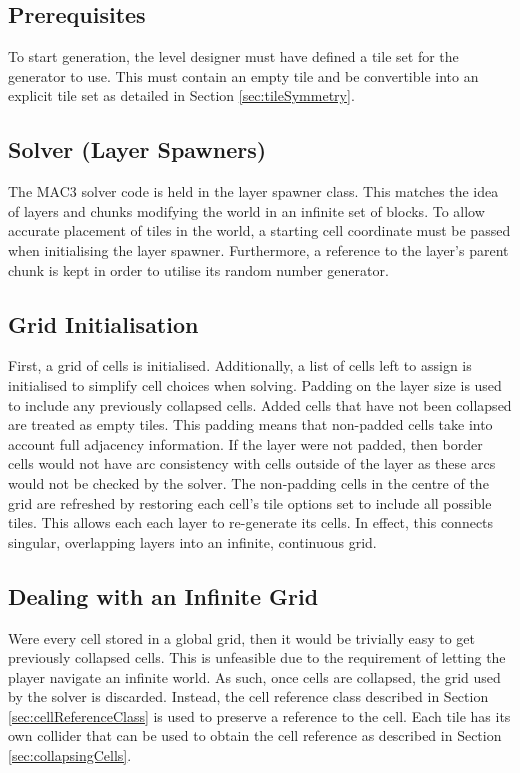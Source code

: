 \subsection{Prerequisites}
To start generation, the level designer must have defined a tile set for the generator to use. This must contain an empty tile and be convertible into an explicit tile set as detailed in Section \ref{sec:tileSymmetry}.

\subsection{Solver (Layer Spawners)}
The MAC3 solver code is held in the layer spawner class. This matches the idea of layers and chunks modifying the world in an infinite set of blocks. To allow accurate placement of tiles in the world, a starting cell coordinate must be passed when initialising the layer spawner. Furthermore, a reference to the layer's parent chunk is kept in order to utilise its random number generator.

\subsection{Grid Initialisation}
First, a grid of cells is initialised. Additionally, a list of cells left to assign is initialised to simplify cell choices when solving. Padding on the layer size is used to include any previously collapsed cells. Added cells that have not been collapsed are treated as empty tiles. This padding means that non-padded cells take into account full adjacency information. If the layer were not padded, then border cells would not have arc consistency with cells outside of the layer as these arcs would not be checked by the solver. The non-padding cells in the centre of the grid are refreshed by restoring each cell's tile options set to include all possible tiles. This allows each each layer to re-generate its cells. In effect, this connects singular, overlapping layers into an infinite, continuous grid.%

\subsection{Dealing with an Infinite Grid}
Were every cell stored in a global grid, then it would be trivially easy to get previously collapsed cells. This is unfeasible due to the requirement of letting the player navigate an infinite world. As such, once cells are collapsed, the grid used by the solver is discarded. Instead, the cell reference class described in Section \ref{sec:cellReferenceClass} is used to preserve a reference to the cell. Each tile has its own collider that can be used to obtain the cell reference as described in Section \ref{sec:collapsingCells}.%

